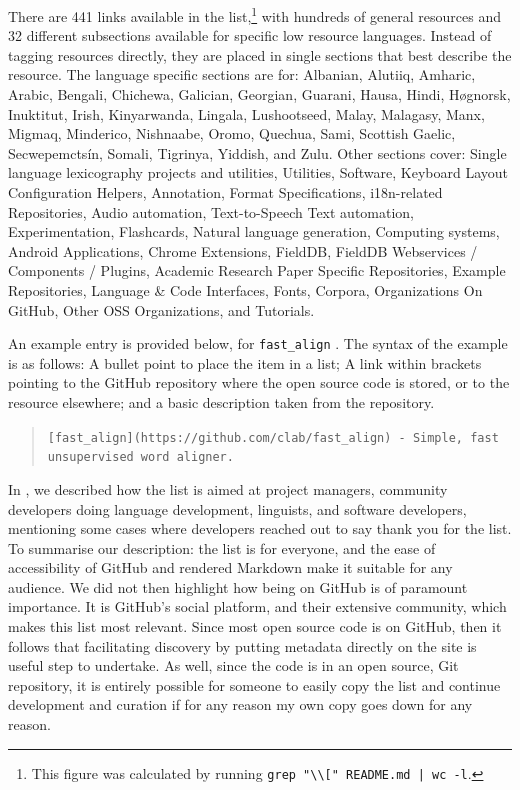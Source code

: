 There are 441 links available in the list,\footnote{This figure was calculated by running \texttt{grep "\textbackslash* \textbackslash[" README.md | wc -l}.} with hundreds of general resources and 32 different subsections available for specific low resource languages. Instead of tagging resources directly, they are placed in single sections that best describe the resource. The language specific sections are for: Albanian, Alutiiq, Amharic, Arabic, Bengali, Chichewa, Galician, Georgian, Guarani, Hausa, Hindi, H\o gnorsk, Inuktitut, Irish, Kinyarwanda, Lingala, Lushootseed, Malay, Malagasy, Manx, Migmaq, Minderico, Nishnaabe, Oromo, Quechua, Sami, Scottish Gaelic, Secwepemcts\'in, Somali, Tigrinya, Yiddish, and Zulu. Other sections cover: Single language lexicography projects and utilities, Utilities, Software, Keyboard Layout Configuration Helpers, Annotation, Format Specifications, i18n-related Repositories, Audio automation, Text-to-Speech
Text automation, Experimentation, Flashcards, Natural language generation, Computing systems, Android Applications, Chrome Extensions, FieldDB, FieldDB Webservices / Components / Plugins, Academic Research Paper Specific Repositories, Example Repositories, Language \& Code Interfaces, Fonts, Corpora, Organizations On GitHub, Other OSS Organizations, and Tutorials.

An example entry is provided below, for {\tt fast\_align} \citep{dyer2013simple}. The syntax of the example is as follows: A bullet point to place the item in a list; A link within brackets pointing to the GitHub repository where the open source code is stored, or to the resource elsewhere; and a basic description taken from the repository.

\begin{quote}
{\tt * [fast\_align](https://github.com/clab/fast\_align) - Simple, fast unsupervised word aligner.}
\end{quote}

In \citet{CCURL}, we described how the list is aimed at project managers, community developers doing language development, linguists, and software developers, mentioning some cases where developers reached out to say thank you for the list. To summarise our description: the list is for everyone, and the ease of accessibility of GitHub and rendered Markdown make it suitable for any audience. We did not then highlight how being on GitHub is of paramount importance. It is GitHub's social platform, and their extensive community, which makes this list most relevant. Since most open source code is on GitHub, then it follows that facilitating discovery by putting metadata directly on the site is useful step to undertake. As well, since the code is in an open source, Git repository, it is entirely possible for someone to easily copy the list and continue development and curation if for any reason my own copy goes down for any reason.

